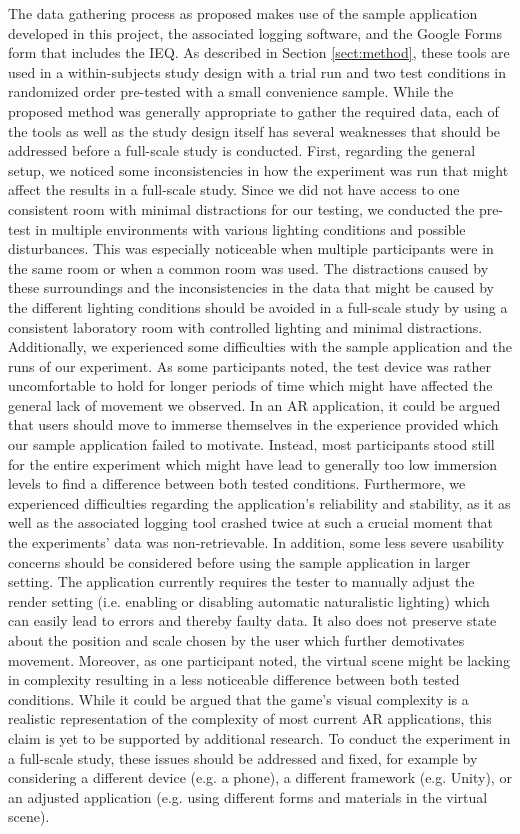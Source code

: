 \documentclass[12pt,twoside,english]{article}
\begin{document}
The data gathering process as proposed makes use of the sample application developed in this project, the associated logging software, and the Google Forms form that includes the \gls{IEQ}.
As described in Section \ref{sect:method}, these tools are used in a within-subjects study design with a trial run and two test conditions in randomized order pre-tested with a small convenience sample.
While the proposed method was generally appropriate to gather the required data, each of the tools as well as the study design itself has several weaknesses that should be addressed before a full-scale study is conducted.
First, regarding the general setup, we noticed some inconsistencies in how the experiment was run that might affect the results in a full-scale study.
Since we did not have access to one consistent room with minimal distractions for our testing, we conducted the pre-test in multiple environments with various lighting conditions and possible disturbances.
This was especially noticeable when multiple participants were in the same room or when a common room was used.
The distractions caused by these surroundings and the inconsistencies in the data that might be caused by the different lighting conditions should be avoided in a full-scale study by using a consistent laboratory room with controlled lighting and minimal distractions.
Additionally, we experienced some difficulties with the sample application and the runs of our experiment.
As some participants noted, the test device was rather uncomfortable to hold for longer periods of time which might have affected the general lack of movement we observed.
In an \gls{AR} application, it could be argued that users should move to immerse themselves in the experience provided which our sample application failed to motivate.
Instead, most participants stood still for the entire experiment which might have lead to generally too low immersion levels to find a difference between both tested conditions.
Furthermore, we experienced difficulties regarding the application's reliability and stability, as it as well as the associated logging tool crashed twice at such a crucial moment that the experiments' data was non-retrievable.
In addition, some less severe usability concerns should be considered before using the sample application in larger setting.
The application currently requires the tester to manually adjust the render setting (i.e. enabling or disabling automatic naturalistic lighting) which can easily lead to errors and thereby faulty data.
It also does not preserve state about the position and scale chosen by the user which further demotivates movement.
Moreover, as one participant noted, the virtual scene might be lacking in complexity resulting in a less noticeable difference between both tested conditions.
While it could be argued that the game's visual complexity is a realistic representation of the complexity of most current \gls{AR} applications, this claim is yet to be supported by additional research.
To conduct the experiment in a full-scale study, these issues should be addressed and fixed, for example by considering a different device (e.g. a phone), a different framework (e.g. Unity), or an adjusted application (e.g. using different forms and materials in the virtual scene).
\end{document}
